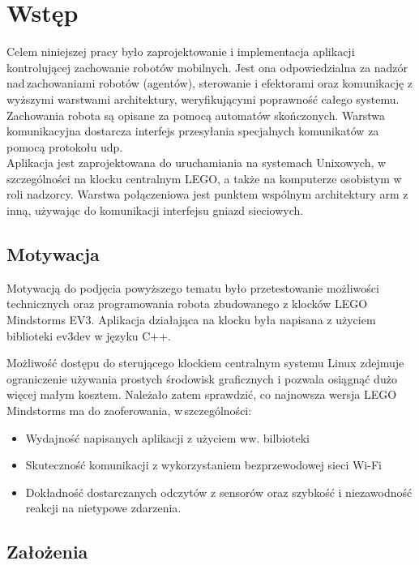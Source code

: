 \chapter{Wstęp}
\label{ch:wstep}

Celem niniejszej pracy było zaprojektowanie i implementacja aplikacji kontrolującej zachowanie robotów mobilnych. Jest ona odpowiedzialna za nadzór nad\,zachowaniami robotów (agentów), sterowanie  i efektorami oraz komunikację z wyższymi warstwami architektury, weryfikującymi poprawność całego systemu. Zachowania robota są opisane za pomocą automatów skończonych. Warstwa komunikacyjna dostarcza interfejs przesyłania specjalnych komunikatów za pomocą protokołu \Gls{udp}.\\

Aplikacja jest zaprojektowana do uruchamiania na systemach Unixowych, w\,szczególności na klocku centralnym LEGO, a także na komputerze osobistym w\,roli nadzorcy. Warstwa połączeniowa jest punktem wspólnym architektury \Gls{arm} z inną, używając do komunikacji interfejsu gniazd sieciowych.
\clearpage

\section{Motywacja}

Motywacją do podjęcia powyższego tematu było przetestowanie możliwości technicznych oraz programowania robota zbudowanego z klocków LEGO Mindstorms EV3. Aplikacja działająca na klocku była napisana z użyciem biblioteki ev3dev \cite{ev3dev} w języku C++.

Możliwość dostępu do sterującego klockiem centralnym systemu Linux zdejmuje ograniczenie używania prostych środowisk graficznych i pozwala osiągnąć dużo więcej małym kosztem. Należało zatem sprawdzić, co najnowsza wersja LEGO Mindstorms ma do zaoferowania, w\,szczególności:
\begin{itemize}
    \item Wydajność napisanych aplikacji z użyciem ww. bilbioteki
    \item Skuteczność komunikacji z wykorzystaniem bezprzewodowej sieci Wi-Fi
    \item Dokładność dostarczanych odczytów z sensorów oraz szybkość i niezawodność reakcji na nietypowe zdarzenia.
\end{itemize}

\section{Założenia}

